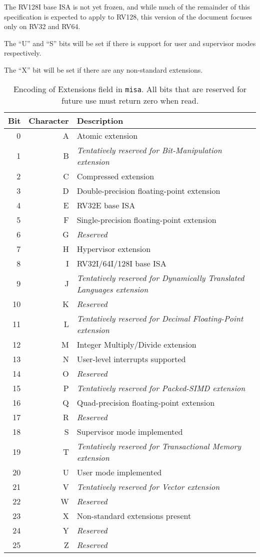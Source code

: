 The RV128I base ISA is not yet frozen, and while much of the remainder of this
specification is expected to apply to RV128, this version of the document
focuses only on RV32 and RV64.

The ``U'' and ``S'' bits will be set if there is support for user and
supervisor modes respectively.

The ``X'' bit will be set if there are any non-standard extensions.

\begin{table*}
\begin{center}
\begin{tabular}{|r|r|l|}
\hline
Bit & Character  & Description \\
\hline	 
  0 & A & Atomic extension \\
  1 & B & {\em Tentatively reserved for Bit-Manipulation extension} \\
  2 & C & Compressed extension \\
  3 & D & Double-precision floating-point extension \\
  4 & E & RV32E base ISA \\
  5 & F & Single-precision floating-point extension \\
  6 & G & {\em Reserved} \\
  7 & H & Hypervisor extension \\
  8 & I & RV32I/64I/128I base ISA \\
  9 & J & {\em Tentatively reserved for Dynamically Translated Languages extension} \\
 10 & K & {\em Reserved} \\
 11 & L & {\em Tentatively reserved for Decimal Floating-Point extension} \\
 12 & M & Integer Multiply/Divide extension \\
 13 & N & User-level interrupts supported \\
 14 & O & {\em Reserved} \\
 15 & P & {\em Tentatively reserved for Packed-SIMD extension} \\
 16 & Q & Quad-precision floating-point extension \\
 17 & R & {\em Reserved} \\
 18 & S & Supervisor mode implemented \\
 19 & T & {\em Tentatively reserved for Transactional Memory extension} \\
 20 & U & User mode implemented \\
 21 & V & {\em Tentatively reserved for Vector extension} \\
 22 & W & {\em Reserved} \\
 23 & X & Non-standard extensions present \\
 24 & Y & {\em Reserved} \\
 25 & Z & {\em Reserved} \\
\hline
\end{tabular}
\end{center}
\caption{Encoding of Extensions field in {\tt misa}.  All bits that are
  reserved for future use must return zero when read.}
\label{misaletters}
\end{table*}


